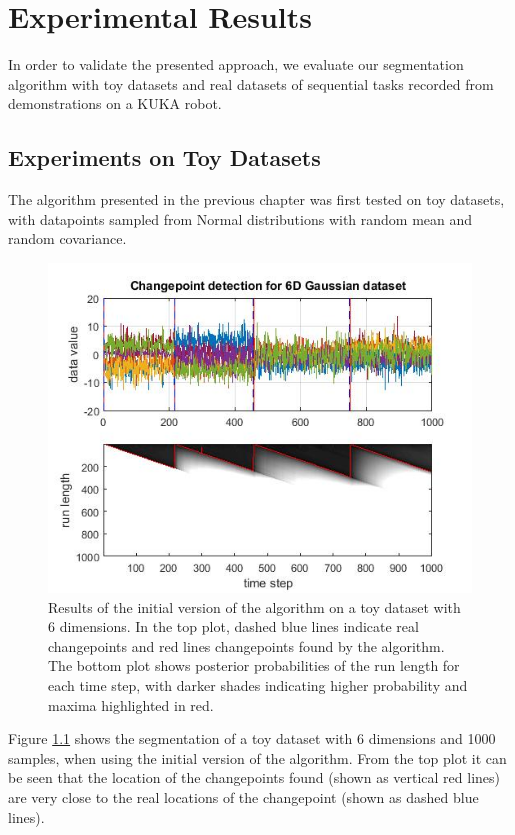 \documentclass[11pt,twoside,a4paper]{report}
\begin{document}
\chapter{Experimental Results} \label{ch:exp}

In order to validate the presented approach, we evaluate our segmentation algorithm with toy datasets and real datasets of sequential tasks recorded from demonstrations on a KUKA robot. 

\section{Experiments on Toy Datasets}

The algorithm presented in the previous chapter was first tested on toy datasets, with datapoints sampled from Normal distributions with random mean and random covariance.

\begin{figure}[h]
\centering
\includegraphics[width=.7\textwidth]{6d_gauss_full.jpg}
\caption{Results of the initial version of the algorithm on a toy dataset with 6 dimensions. In the top plot, dashed blue lines indicate real changepoints and red lines changepoints found by the algorithm. The bottom plot shows posterior probabilities of the run length for each time step, with darker shades indicating higher probability and maxima highlighted in red.}
\label{fig:ex6dims}
\end{figure}

Figure \ref{fig:ex6dims} shows the segmentation of a toy dataset with 6 dimensions and 1000 samples, when using the initial version of the algorithm. From the top plot it can be seen that the location of the changepoints found (shown as vertical red lines) are very close to the real locations of the changepoint (shown as dashed blue lines).
\end{document}
